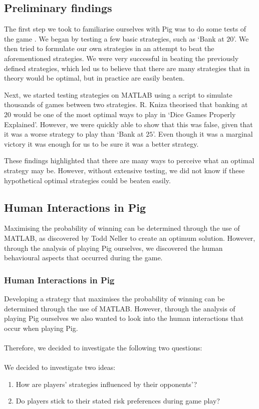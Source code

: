 \documentclass[a4paper,titlepage]{article}
\begin{document}
\subsection{Preliminary findings}
The first step we took to familiarise ourselves with Pig was to do some tests of the game . We began by testing a few basic strategies, such as `Bank at $20$'. We then tried to formulate our own strategies in an attempt to beat the aforementioned strategies. We were very successful in beating the previously defined strategies, which led us to believe that there are many strategies that in theory would be optimal, but in practice are easily beaten.

Next, we started testing strategies on MATLAB using a script to simulate thousands of games between two strategies. R. Kniza theorised that banking at $20$ would be one of the most optimal ways to play in `Dice Games Properly Explained'. However, we were quickly able to show that this was false, given that it was a worse strategy to play than `Bank at $25$'. Even though it was a marginal victory it was enough for us to be sure it was a better strategy.

These findings highlighted that there are many ways to perceive what an optimal strategy may be. However, without extensive testing, we did not know if these hypothetical optimal strategies could be beaten easily.

\subsection{Human Interactions in Pig}
Maximising the probability of winning can be determined through the use of MATLAB, as discovered by Todd Neller\cite{neller2004optimal} to create an optimum solution. However, through the analysis of playing Pig ourselves, we discovered the human behavioural aspects that occurred during the game.


\subsubsection{Human Interactions in Pig}
Developing a strategy that maximises the probability of winning can be determined through the use of MATLAB. However, through the analysis of playing Pig ourselves we also wanted to look into the human interactions that occur when playing Pig.
\\
\\
Therefore, we decided to investigate the following two questions:
\\
\\
We decided to investigate two ideas:
\begin{enumerate}
\item How are players' strategies influenced by their opponents'?
\item Do players stick to their stated risk preferences during game play?
\end{enumerate}
\end{document}
